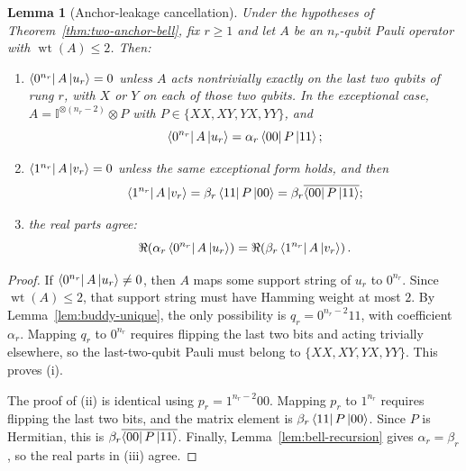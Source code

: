 \documentclass[11pt]{article}
\newcommand{\wt}{\operatorname{wt}}
\newcommand{\id}{\mathbb I}
\newtheorem{lemma}[theorem]{Lemma}
\begin{document}
\begin{lemma}[Anchor-leakage cancellation]
\label{lem:anchor-leakage}
Under the hypotheses of Theorem~\ref{thm:two-anchor-bell}, fix $r\ge1$ and let $A$ be an
$n_r$-qubit Pauli operator with $\wt(A)\le2$.  Then:
\begin{enumerate}[label=\textup{(\roman*)}]
\item $\bra{0^{n_r}}A\ket{u_r}=0$ unless $A$ acts nontrivially exactly on the last two qubits of
rung $r$, with $X$ or $Y$ on each of those two qubits.  In the exceptional case,
$A=\id^{\otimes(n_r-2)}\otimes P$ with $P\in\{XX,XY,YX,YY\}$, and
\begin{equation}
  \bra{0^{n_r}}A\ket{u_r}=\alpha_r\bra{00}P\ket{11};
  \label{eq:anchor-leakage-zero}
\end{equation}
\item $\bra{1^{n_r}}A\ket{v_r}=0$ unless the same exceptional form holds, and then
\begin{equation}
  \bra{1^{n_r}}A\ket{v_r}=\beta_r\bra{11}P\ket{00}
  =\beta_r\overline{\bra{00}P\ket{11}};
  \label{eq:anchor-leakage-one}
\end{equation}
\item the real parts agree:
\begin{equation}
  \Re\!\left(\alpha_r\bra{0^{n_r}}A\ket{u_r}\right)
  =
  \Re\!\left(\beta_r\bra{1^{n_r}}A\ket{v_r}\right).
  \label{eq:anchor-leakage-real}
\end{equation}
\end{enumerate}
\end{lemma}

\begin{proof}
If $\bra{0^{n_r}}A\ket{u_r}\ne0$, then $A$ maps some support string of $u_r$ to $0^{n_r}$.  Since
$\wt(A)\le2$, that support string must have Hamming weight at most $2$.  By
Lemma~\ref{lem:buddy-unique}, the only possibility is $q_r=0^{n_r-2}11$, with coefficient
$\alpha_r$.  Mapping $q_r$ to $0^{n_r}$ requires flipping the last two bits and acting trivially
elsewhere, so the last-two-qubit Pauli must belong to $\{XX,XY,YX,YY\}$.  This proves (i).

The proof of (ii) is identical using $p_r=1^{n_r-2}00$.  Mapping $p_r$ to $1^{n_r}$ requires
flipping the last two bits, and the matrix element is
$\beta_r\bra{11}P\ket{00}$.  Since $P$ is Hermitian, this is
$\beta_r\overline{\bra{00}P\ket{11}}$.  Finally, Lemma~\ref{lem:bell-recursion} gives
$\alpha_r=\beta_r$, so the real parts in (iii) agree.
\end{proof}
\end{document}
